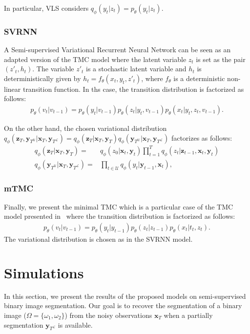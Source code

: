 \documentclass{article}
\def\x{{\mathbf x}}
\def\z{{\mathbf z}}
\def\y{{\mathbf y}}
\def\yl{{\mathbf y}_{T^{\mathcal{L}}}}
\def\yu{{\mathbf y}_{T^{\mathcal{U}}}}
\def\p{p_{\theta}}
\def\q{q_\phi}
\def\U{\mathcal{U}}
\begin{document}
In particular, VLS considers $\q(y_t| z_t) =  \p(y_t| z_t)$.

\subsubsection{SVRNN}
A Semi-supervised Variational Recurrent Neural Network can be seen as an adapted
version of the TMC model where the latent variable $z_t$ is set as
the pair $(z'_t, h_t)$. The variable $z'_t$ is a stochastic latent variable 
and $h_t$ is deterministically given by $h_t = f_{\theta}(x_t, y_t, z'_t)$, 
where $f_{\theta}$ is a deterministic non-linear transition function. 
In ths case, the transition distribution is factorized as follows:
\begin{align}
\label{eq:svrnn}
\p(v_t|v_{t-1}\!) \!= \!\p(y_t|v_{t-1}\!) \p(z_t|y_t,\! v_{t-1}\!) \p(x_t|y_t,z_t,\!v_{t-1}\!) \text{.}
\end{align}

On the other hand, the chosen variational distribution 
$\q(\z_T, \yu| \x_T, \yl) =  \q(\z_T| \x_T, \y_T ) \q(\yu| \x_T, \yl )$  
factorizes as follows:
\begin{align*}
\q(\z_T| \x_T, \y_T ) =&  \q(z_0|\x_t, \y_t) \prod_{t=1}^T \q(z_t|\z_{t-1},\x_t, \y_t)  \\
\q(\yu| \x_T, \yl )=& \prod_{t\in  \U} \q(y_t|\y_{t-1}, \x_t) \text{,}
\end{align*}



\subsubsection{mTMC}
Finally, we present the minimal TMC which  is a particular case of 
the TMC model  presented in~\cite{gangloff2023deep}
where 
the transition distribution is factorized as follows:
\begin{align}
    \label{eq:mTMC}
    \p(v_t|v_{t-1}) \!= \!\p(y_t|y_{t-1}) \p(z_t|z_{t-1}) \p(x_t|t_t,z_t) \text{.}
\end{align}
The variational distribution is chosen as in the SVRNN model.

\section{Simulations}
\label{sec:simulation}
In this section, we present the results of the proposed models on
semi-supervised binary image segmentation. Our goal is to recover the segmentation of a binary image 
($\Omega=\{\omega_1,\omega_2\}$) from the noisy observations
$\x_T$ when a partially segmentation $\yl$ is available.
\end{document}
